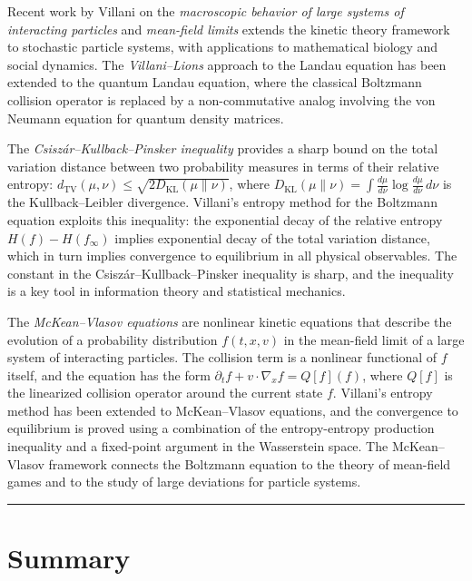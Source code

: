 Recent work by Villani on the \emph{macroscopic behavior of large systems of interacting particles} and \emph{mean-field limits} extends the kinetic theory framework to stochastic particle systems, with applications to mathematical biology and social dynamics. The \emph{Villani--Lions} approach to the Landau equation has been extended to the quantum Landau equation, where the classical Boltzmann collision operator is replaced by a non-commutative analog involving the von Neumann equation for quantum density matrices.

The \emph{Csisz\'{a}r--Kullback--Pinsker inequality} provides a sharp bound on the total variation distance between two probability measures in terms of their relative entropy: $d_{\text{TV}}(\mu,\nu) \leq \sqrt{2 D_{\text{KL}}(\mu \| \nu)}$, where $D_{\text{KL}}(\mu \| \nu) = \int \frac{d\mu}{d\nu} \log \frac{d\mu}{d\nu} \, d\nu$ is the Kullback--Leibler divergence. Villani's entropy method for the Boltzmann equation exploits this inequality: the exponential decay of the relative entropy $H(f) - H(f_\infty)$ implies exponential decay of the total variation distance, which in turn implies convergence to equilibrium in all physical observables. The constant in the Csisz\'{a}r--Kullback--Pinsker inequality is sharp, and the inequality is a key tool in information theory and statistical mechanics.

The \emph{McKean--Vlasov equations} are nonlinear kinetic equations that describe the evolution of a probability distribution $f(t,x,v)$ in the mean-field limit of a large system of interacting particles. The collision term is a nonlinear functional of $f$ itself, and the equation has the form $\partial_t f + v \cdot \nabla_x f = Q[f](f)$, where $Q[f]$ is the linearized collision operator around the current state $f$. Villani's entropy method has been extended to McKean--Vlasov equations, and the convergence to equilibrium is proved using a combination of the entropy-entropy production inequality and a fixed-point argument in the Wasserstein space. The McKean--Vlasov framework connects the Boltzmann equation to the theory of mean-field games and to the study of large deviations for particle systems.

\begin{center}\rule{0.5\linewidth}{0.5pt}\end{center}

\section*{Summary}

